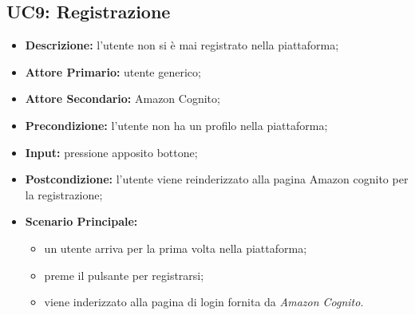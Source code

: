 \subsection{UC9: Registrazione}
\label{sec:UC9}
\begin{itemize}
    \item \textbf{Descrizione:} l'utente non si è mai registrato nella piattaforma;
    \item \textbf{Attore Primario:} utente generico;
    \item \textbf{Attore Secondario:} Amazon Cognito;
    \item \textbf{Precondizione:} l'utente non ha un profilo nella piattaforma;
    \item \textbf{Input:} pressione apposito bottone;
    \item \textbf{Postcondizione:} l'utente viene reinderizzato alla pagina Amazon cognito per la registrazione;
    \item \textbf{Scenario Principale:}
    \begin{itemize}
        \item un utente arriva per la prima volta nella piattaforma;
        \item preme il pulsante per registrarsi;
        \item viene inderizzato alla pagina di login fornita da \textit{Amazon Cognito}.
    \end{itemize}
\end{itemize}